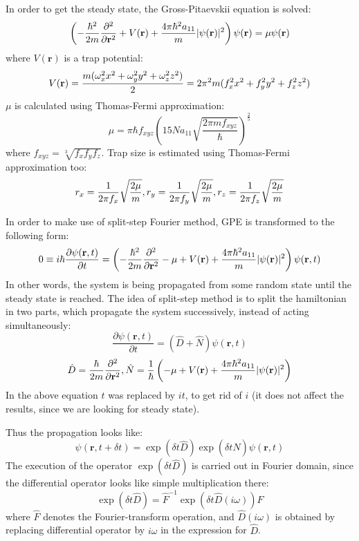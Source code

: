 \documentclass[12pt,notitlepage]{report}
\begin{document}
In order to get the steady state, the Gross-Pitaevskii equation is solved:
$$	
\left(-\frac{\hbar^2}{2m}\frac{\partial^2}{\partial \mathbf{r}^2} + V(\mathbf{r}) +\\
\frac{4\pi\hbar^2a_{11}}{m}\vert \psi(\mathbf{r}) \vert^2 \right) \psi(\mathbf{r}) =\\
\mu\psi(\mathbf{r})
$$
where $V(\mathbf{r})$ is a trap potential:
$$
V(\mathbf{r}) = \frac{m(\omega_x^2 x^2 + \omega_y^2 y^2 + \omega_z^2 z^2)}{2} =\\
 2\pi^2 m (f_x^2 x^2 + f_y^2 y^2 + f_z^2 z^2)
$$
$\mu$ is calculated using Thomas-Fermi approximation:
$$
\mu = \pi \hbar f_{xyz} \left( 15 N a_{11} \sqrt{\frac{2 \pi m f_{xyz}}{\hbar}} \right)^{\frac{2}{5}}
$$
where $f_{xyz} = \sqrt[3]{f_x f_y f_z}$. Trap size is estimated using Thomas-Fermi approximation too:
$$
r_x = \frac{1}{2 \pi f_x}\sqrt{\frac{2 \mu}{m}}, r_y = \frac{1}{2 \pi f_y}\sqrt{\frac{2 \mu}{m}},\\
r_z = \frac{1}{2 \pi f_z}\sqrt{\frac{2 \mu}{m}}
$$

In order to make use of split-step Fourier method, GPE is transformed to the following form:
$$
0 \equiv i \hbar \frac{\partial \psi(\mathbf{r}, t)}{\partial t} = \left(-\frac{\hbar^2}{2m}\frac{\partial^2}{\partial \mathbf{r}^2} - \\
\mu + V(\mathbf{r}) + \frac{4\pi\hbar^2a_{11}}{m}\vert \psi(\mathbf{r}) \vert^2 \right) \psi(\mathbf{r}, t)
$$
In other words, the system is being propagated from some random state until the steady state is reached. The idea of split-step method is to split the hamiltonian in two parts, which propagate the system successively, instead of acting simultaneously:
$$
\frac{\partial \psi(\mathbf{r}, t)}{\partial t} = (\hat{D} + \hat{N}) \psi(\mathbf{r}, t)
$$
$$
\hat{D} = \frac{\hbar}{2m}\frac{\partial^2}{\partial \mathbf{r}^2},\\
\hat{N} = \frac{1}{\hbar} \left( -\mu + V(\mathbf{r}) + \frac{4\pi\hbar^2a_{11}}{m}\vert \psi(\mathbf{r}) \vert^2 \right)
$$
In the above equation $t$ was replaced by $it$, to get rid of $i$ (it does not affect the results, since we are looking for steady state).

Thus the propagation looks like:
$$
\psi(\mathbf{r}, t+\delta t) = \exp(\delta t \hat{D}) \exp(\delta t \hat{N}) \psi(\mathbf{r}, t)
$$
The execution of the operator $\exp(\delta t \hat{D})$ is carried out in Fourier domain, since the differential operator looks like simple multiplication there:
$$
\exp(\delta t \hat{D}) = \hat{F}^{-1} \exp \left( \delta t \hat{D} (i\omega) \right) \hat{F}
$$
where $\hat{F}$ denotes the Fourier-transform operation, and $\hat{D} (i\omega)$ is obtained by replacing differential operator by $i\omega$ in the expression for $\hat{D}$.
\end{document}

